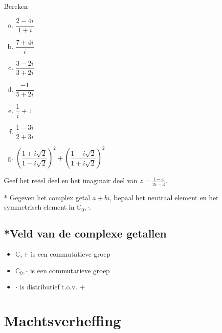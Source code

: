 \documentclass[12pt,twoside]{article}
\begin{document}
\begin{oefening}
  Bereken
  \begin{multicols}{2}
  \begin{enumerate}[(a)]
  \itemsep1em
  \item $\displaystyle \dfrac{2-4i}{1+i}$
  \item $\displaystyle \dfrac{7+4i}{i}$
  \item $\displaystyle \dfrac{3-2i}{3+2i}$
  \item $\displaystyle \dfrac{-1}{5+2i}$
  \item $\displaystyle \dfrac{1}{i}+1$
  \item $\displaystyle \dfrac{1-3i}{2+3i}$
  \item $\displaystyle \left(\dfrac{1+i\sqrt{2}}{1-i\sqrt{2}}\right)^2+\left(\dfrac{1-i\sqrt{2}}{1+i\sqrt{2}}\right)^2$
  \end{enumerate}
  \end{multicols}
\end{oefening}

\begin{oefening}
  Geef het reëel deel en het imaginair deel van $z=\frac{i-4}{2i-3}$.
\end{oefening}

\begin{oefening}*
  Gegeven het complex getal $a+bi$, bepaal het neutraal element en het symmetrisch element in $\mathbb{C}_0, \cdot$.
\end{oefening}

\subsection{*Veld van de complexe getallen}

\begin{itemize}
  \item $\mathbb{C},+$ is een commutatieve groep
  \item $\mathbb{C}_0,\cdot$ is een commutatieve groep
  \item $\cdot$ is distributief t.o.v. $+$
\end{itemize}


\pagebreak

\section{Machtsverheffing}
\end{document}
